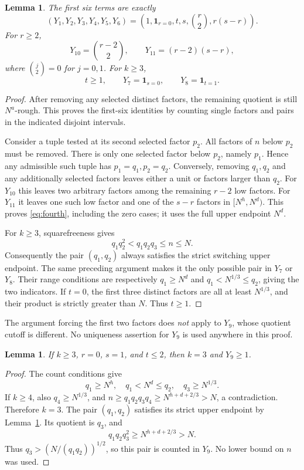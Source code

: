 \documentclass[11pt]{article}
\newtheorem{lemma}[theorem]{Lemma}
\newcommand{\ind}{\mathbf 1}
\begin{document}
\begin{lemma}\label{lem:identities}
The first six terms are exactly
\[
 (Y_1,Y_2,Y_3,Y_4,Y_5,Y_6)
   =\left(1,\ind_{r=0},t,s,\binom r2,r(s-r)\right).
\]
For $r\ge2$,
\begin{equation}\label{eq:fourth}
 Y_{10}=\binom{r-2}{2},\qquad Y_{11}=(r-2)(s-r),
\end{equation}
where $\binom j2=0$ for $j=0,1$. For $k\ge3$,
\begin{equation}\label{eq:pair}
 t\ge1,\qquad Y_7=\ind_{s=0},\qquad Y_8=\ind_{t=1}.
\end{equation}
\end{lemma}
\begin{proof}
After removing any selected distinct factors, the remaining quotient
is still $N^a$-rough. This proves the first-six identities by counting
single factors and pairs in the indicated disjoint intervals.

Consider a tuple tested at its second selected factor $p_2$. All factors
of $n$ below $p_2$ must be removed. There is only one selected factor
below $p_2$, namely $p_1$. Hence any admissible such tuple has
$p_1=q_1,p_2=q_2$. Conversely, removing $q_1,q_2$ and any additionally
selected factors leaves either a unit or factors larger than $q_2$.
For $Y_{10}$ this leaves two arbitrary factors among the remaining
$r-2$ low factors. For $Y_{11}$ it leaves one such low factor and one
of the $s-r$ factors in $[N^h,N^d)$. This proves \eqref{eq:fourth},
including the zero cases; it uses the full upper endpoint $N^d$.

For $k\ge3$, squarefreeness gives
\[
                 q_1q_2^2<q_1q_2q_3\le n\le N.
\]
Consequently the pair $(q_1,q_2)$ always satisfies the strict switching
upper endpoint. The same preceding argument makes it the only possible
pair in $Y_7$ or $Y_8$. Their range conditions are respectively
$q_1\ge N^d$ and $q_1<N^{1/3}\le q_2$, giving the two indicators.
If $t=0$, the first three distinct factors are all at least $N^{1/3}$,
and their product is strictly greater than $N$. Thus $t\ge1$.
\end{proof}

The argument forcing the first two factors does \emph{not} apply to
$Y_9$, whose quotient cutoff is different. No uniqueness assertion for
$Y_9$ is used anywhere in this proof.

\begin{lemma}\label{lem:critical}
If $k\ge3$, $r=0$, $s=1$, and $t\le2$, then $k=3$ and $Y_9\ge1$.
\end{lemma}
\begin{proof}
The count conditions give
\[
 q_1\ge N^h,\quad q_1<N^d\le q_2,\quad q_3\ge N^{1/3}.
\]
If $k\ge4$, also $q_4\ge N^{1/3}$, and
$n\ge q_1q_2q_3q_4\ge N^{h+d+2/3}>N$, a contradiction.
Therefore $k=3$. The pair $(q_1,q_2)$ satisfies its strict upper endpoint
by Lemma~\ref{lem:identities}. Its quotient is $q_3$, and
\begin{equation}\label{eq:critical-cutoff}
 q_1q_2q_3^2\ge N^{h+d+2/3}>N.
\end{equation}
Thus $q_3>(N/(q_1q_2))^{1/2}$, so this pair is counted in $Y_9$.
No lower bound on $n$ was used.
\end{proof}
\end{document}
